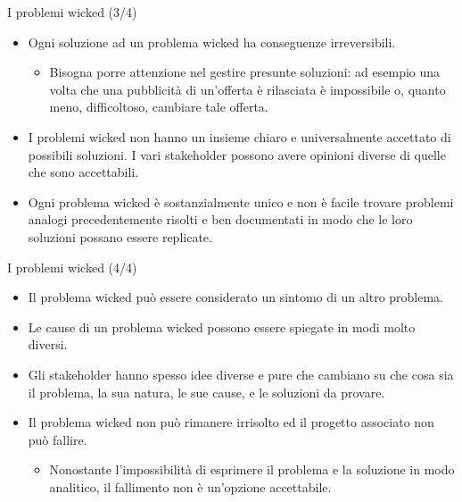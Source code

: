 \documentclass{beamer}
\begin{document}
\begin{frame}{\centerline{I problemi wicked (3/4)}}

\small
\begin{itemize}
\item Ogni soluzione ad un problema wicked ha conseguenze irreversibili. 
\begin{itemize}
\item Bisogna porre attenzione nel gestire presunte soluzioni: ad esempio una volta che una pubblicit\`{a} di un'offerta \`{e} rilasciata \`{e} impossibile o, quanto meno, difficoltoso, cambiare tale offerta.
\end{itemize}

\item I problemi wicked non hanno un insieme chiaro e universalmente accettato di possibili soluzioni. I vari stakeholder possono avere opinioni diverse di quelle che sono accettabili.

\item Ogni problema wicked \`{e} sostanzialmente unico e non \`{e} facile trovare problemi analogi precedentemente risolti e ben documentati in modo che le loro soluzioni possano essere replicate.

\end{itemize}

\end{frame}

\begin{frame}{\centerline{I problemi wicked (4/4)}}

\small
\begin{itemize}

\item Il problema wicked pu\`{o} essere considerato un sintomo di un altro problema.

\item Le cause di un problema wicked possono essere spiegate in modi molto diversi.

\item Gli stakeholder hanno spesso idee diverse e pure che cambiano su che cosa sia il problema, la sua natura, le sue cause, e le soluzioni da provare.

\item Il problema wicked non pu\`{o} rimanere irrisolto ed il progetto associato non pu\`{o} fallire.
\begin{itemize}
\item Nonostante l'impossibilit\`{a} di esprimere il problema e la soluzione in modo analitico, il fallimento non \`{e} un'opzione accettabile.
\end{itemize}

\end{itemize}

\end{frame}
\end{document}
